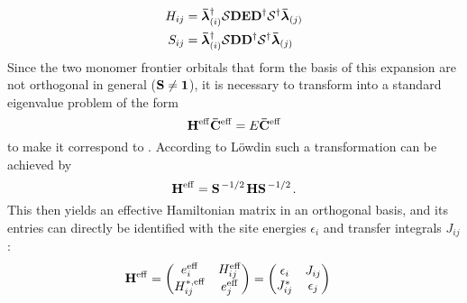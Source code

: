  \begin{equation}
  \begin{aligned}
     H_{ij} &= \mathbf{ \bar{\boldsymbol{\lambda}} }_{(i)}^\dagger \mathbf{ \mathcal{S} } \mathbf{ D } \mathbf{ E } \mathbf{ D }^\dagger \mathbf{ \mathcal{S} }^\dagger \mathbf{ \bar{\boldsymbol{\lambda}} }_{(j)}  \\
     S_{ij} &= \mathbf{ \bar{\boldsymbol{\lambda}} }_{(i)}^\dagger \mathbf{ \mathcal{S} } \mathbf{ D }  \mathbf{ D }^\dagger \mathbf{ \mathcal{S} }^\dagger \mathbf{ \bar{\boldsymbol{\lambda}} }_{(j)} 
  \end{aligned}
   \label{eq:dipro_eq20}
 \end{equation}
%
Since the two monomer frontier orbitals that form the basis of this expansion are not orthogonal in general ($\mathbf{ S } \neq \mathbf{ 1 }$), it is necessary to transform  into a standard eigenvalue problem of the form
%
\begin{equation}
  \mathbf{ H }^{\mathrm{eff}} \mathbf{ \bar{C} }^{\mathrm{eff}} =   E \mathbf{ \bar{C} }^{\mathrm{eff}} 
  \label{eq:dipro_eq7}
\end{equation}
%
to make it correspond to . According to L\"owdin such a transformation can be achieved by
%
\begin{equation}
  \mathbf{ H^\mathrm{eff} } = \mathbf{ S }^{\left. {-1} \middle/ {2} \right.}
  \mathbf{ H }\mathbf{ S }^{\left. {-1} \middle/ {2} \right.}.
  \label{eq:dipro_eq9}
\end{equation}
%
This then yields an effective Hamiltonian matrix in an orthogonal basis, and its entries can directly be identified with the site energies $\epsilon_i$ and transfer integrals $J_{ij}$:
%
\begin{equation}
 \begin{aligned}
  \mathbf{ H }^{\mathrm{eff}} &= 
    \begin{pmatrix}
      e_i^{\mathrm{eff}}    &  H_{ij}^\mathrm{eff} \\
      H_{ij}^{*,\mathrm{eff}}   &  e_j^\mathrm{eff}  
    \end{pmatrix} =
    \begin{pmatrix}
      \epsilon_i    &  J_{ij} \\
      J_{ij}^*      &  \epsilon_j  
    \end{pmatrix} 
 \end{aligned}
  \label{eq:dipro_eq11}
\end{equation}


